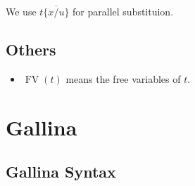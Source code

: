 \documentclass[a4paper,fleqn]{article}
\def\gallina{\textrm{Gallina}}
\DeclareMathOperator{\FV}{FV}
\newcommand{\substm}[3]{#1\{\overline{#2/#3}\}}
\begin{document}
We use $\substm{t}{x}{u}$ for parallel substituion.

\subsection{Others}

\begin{itemize}
  \item $\FV(t)$ means the free variables of $t$.
\end{itemize}

\section{\gallina{}}\label{sec:gallina}
\subsection{\gallina{} Syntax}\label{sec:gallina-syntax}
\end{document}
